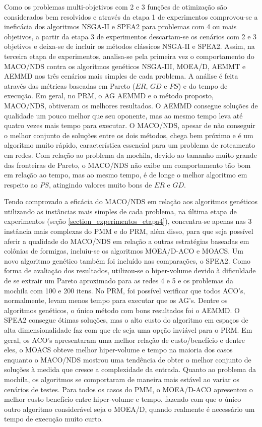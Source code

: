 Como os problemas multi-objetivos com 2 e 3 funções de otimização são considerados bem resolvidos e através da etapa 1 de experimentos comprovou-se a ineficácia dos algoritmos NSGA-II e SPEA2 para problemas com 4 ou mais objetivos, a partir da etapa 3 de experimentos descartam-se os cenários com 2 e 3 objetivos e deixa-se de incluir os métodos clássicos NSGA-II e SPEA2. Assim, na terceira etapa de experimentos, analisa-se pela primeira vez o comportamento do MACO/NDS contra os algoritmos genéticos NSGA-III, MOEA/D, AEMMT e AEMMD nos três cenários mais simples de cada problema. A análise é feita através das métricas baseadas em Pareto ($ER$, $GD$ e $PS$) e do tempo de execução. Em geral, no PRM, o AG AEMMD e o método proposto, MACO/NDS, obtiveram os melhores resultados. O AEMMD consegue soluções de qualidade um pouco melhor que seu oponente, mas ao mesmo tempo leva até quatro vezes mais tempo para executar. O MACO/NDS, apesar de não conseguir o melhor conjunto de soluções entre os dois métodos, chega bem próximo e é um algoritmo muito rápido, característica essencial para um problema de roteamento em redes. Com relação ao problema da mochila, devido ao tamanho muito grande das fronteiras de Pareto, o MACO/NDS não exibe um comportamento tão bom em relação ao tempo, mas ao mesmo tempo, é de longe o melhor algoritmo em respeito ao $PS$, atingindo valores muito bons de $ER$ e $GD$.

Tendo comprovado a eficácia do MACO/NDS em relação aos algoritmos genéticos utilizando as instâncias mais simples de cada problema, na última etapa de experimentos (seção \ref{section_experimentos_etapa4}), concentra-se apenas nas 3 instância mais complexas do PMM e do PRM, além disso, para que seja possível aferir a qualidade do MACO/NDS em relação a outras estratégias baseadas em colônias de formigas, incluiu-se os algoritmos MOEA/D-ACO e MOACS. Um novo algoritmo genético também foi incluído nas comparações, o SPEA2. Como forma de avaliação dos resultados, utilizou-se o hiper-volume devido à dificuldade de se extrair um Pareto aproximado para as redes 4 e 5 e os problemas da mochila com 100 e 200 itens. No PRM, foi possível verificar que todos ACO's, normalmente, levam menos tempo para executar que os AG's. Dentre os algoritmos genéticos, o único método com bons resultados foi o AEMMD. O SPEA2 consegue ótimas soluções, mas o alto custo do algoritmo em espaços de alta dimensionalidade faz com que ele seja uma opção inviável para o PRM. Em geral, os ACO's apresentaram uma melhor relação de custo/benefício e dentre eles, o MOACS obteve melhor hiper-volume e tempo na maioria dos casos enquanto o MACO/NDS mostrou uma tendência de obter o melhor conjunto de soluções à medida que cresce a complexidade da entrada. Quanto ao problema da mochila, os algoritmos se comportaram de maneira mais estável ao variar os cenários de testes. Para todos os casos do PMM, o MOEA/D-ACO apresentou o melhor custo benefício entre hiper-volume e tempo, fazendo com que o único outro algoritmo considerável seja o MOEA/D, quando realmente é necessário um tempo de execução muito curto.

